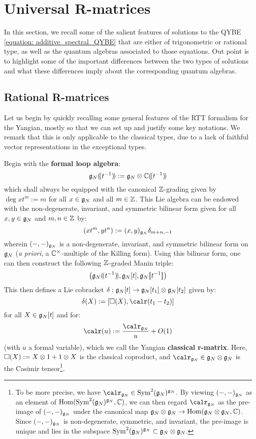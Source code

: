 \section{Universal R-matrices}
    In this section, we recall some of the salient features of solutions to the QYBE \eqref{equation: additive_spectral_QYBE} that are either of trigonometric or rational type, as well as the quantum algebras associated to those equations. Out point is to highlight some of the important differences between the two types of solutions and what these differences imply about the corresponding quantum algebras.

    \subsection{Rational R-matrices}
        Let us begin by quickly recalling some general features of the RTT formalism for the Yangian, mostly so that we can set up and justify some key notations. We remark that this is only applicable to the classical types, due to a lack of faithful vector representations in the exceptional types.
            
        Begin with the \textbf{formal loop algebra}:
            $$\g_N(\!(t^{-1})\!) := \g_N \tensor \bbC(\!(t^{-1})\!)$$
        which shall always be equipped with the canonical $\mathbb{Z}$-grading given by $\deg xt^m := m$ for all $x \in \mathfrak{g}_N$ and all $m \in \mathbb{Z}$. This Lie algebra can be endowed with the non-degenerate, invariant, and symmetric bilinear form given for all $x, y \in \mathfrak{g}_N$ and $m, n \in \mathbb{Z}$ by:
            $$(xt^m, yt^n) := (x, y)_{\mathfrak{g}_N} \delta_{m + n, -1}$$
        wherein $(-, -)_{\mathfrak{g}_N}$ is a non-degenerate, invariant, and symmetric bilinear form on $\mathfrak{g}_N$ (\textit{a priori}, a $\bbC^{\x}$-multiple of the Killing form). Using this bilinear form, one can then construct the following $\mathbb{Z}$-graded Manin triple:
            $$\left( \mathfrak{g}_N(\!(t^{-1})\!), \mathfrak{g}_N[t], \mathfrak{g}_N[\![t^{-1}]\!] \right)$$
        This then defines a Lie cobracket $\delta: \g_N[t] \to \g_N[t_1] \tensor \g_N[t_2]$ given by:
            $$\delta( X ) := [\Box(X), \calr(t_1 - t_2)]$$
        for all $X \in \mathfrak{g}_N[t]$ and for:
            $$\calr(u) := \frac{\calr_{\g_N}}{u} + O(1)$$
        (with $u$ a formal variable), which we call the Yangian \textbf{classical r-matrix}. Here, $\Box(X) := X \tensor 1 + 1 \tensor X$ is the  classical coproduct, and $\calr_{\g_N} \in \g_N \tensor \g_N$ is the Casimir tensor\footnote{To be more precise, we have $\calr_{\g_N} \in \Sym^2(\g_N)^{\g_N}$. By viewing $(-, -)_{\mathfrak{g}_N}$ as an element of $\operatorname{Hom}( \operatorname{Sym}^2(\mathfrak{g}_N)^{\mathfrak{g}_N}, \mathbb{C} )$, we can then regard $\calr_{\g_N}$ as the pre-image of $(-, -)_{\mathfrak{g}_N}$ under the canonical map $\g_N \tensor \g_N \to \Hom(\g_N \tensor \g_N, \bbC)$. Since $(-, -)_{\mathfrak{g}_N}$ is non-degenerate, symmetric, and invariant, the pre-image is unique and lies in the subspace $\Sym^2(\g_N)^{\g_N} \subset \g_N \tensor \g_N$.}.
        
